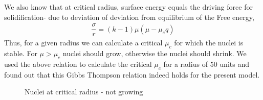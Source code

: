 \documentclass[12pt,a4paper]{report}
\begin{document}
	We also know that at critical radius, surface energy equals the driving force for solidification- 
	due to deviation of deviation from equilibrium of the Free energy,
	\begin{align*}
	\dfrac{\sigma}{r} = (k-1)\mu\left(\mu-\mu_eq\right)
	\end{align*}
	Thus, for a given radius we can calculate a critical $\mu_c$ for which the nuclei is 
	stable. For $\mu > \mu_c$ nuclei should grow, otherwise the nuclei should shrink.	
	We used the above relation to calculate the critical $\mu_c$ for a 
	radius of 50 units and found out that this Gibbs Thompson relation indeed holds for 
	the present model.
	
	\begin{figure}[!htbp]
	\centering
	\hspace{.25in}
	\hspace{.25in}
	\centering
	\caption{Nuclei at critical radius - not growing}
	\end{figure}
	
\end{document}
